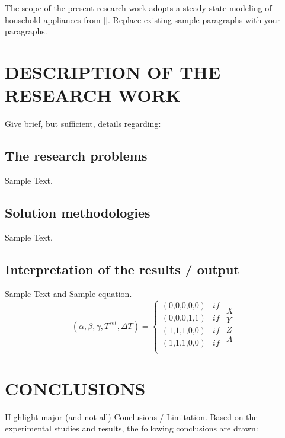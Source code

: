 \documentclass[12pt,a4paper, twoside]{report}
\begin{document}
The scope of the present research work adopts a steady state modeling of household appliances from [\cite{arun2017}]. Replace existing sample paragraphs with your paragraphs.

\section{DESCRIPTION OF THE RESEARCH WORK}
Give brief, but sufficient, details regarding:

\subsection{The research problems}
Sample Text.

\subsection{Solution methodologies}
Sample Text.

\subsection{Interpretation of the results / output}
Sample Text and Sample equation.
\begin{equation}
\left(\alpha,\beta,\gamma, T^{set},\Delta T \right)=\left\{ \begin{matrix}
   \left( \text{0,0,0,0,0} \right) & if  \\
   \left( \text{0,0,0,1,1} \right) & if  \\
   \left( \text{1,1,1,0,0} \right) & if  \\
   \left( \text{1,1,1,0,0} \right) & if  \\
\end{matrix} \right.
\begin{matrix}
   X \\
   Y  \\
   Z  \\
   A   \\
\end{matrix}
\label{Requirements}
\end{equation}

\section{CONCLUSIONS}
Highlight major (and not all) Conclusions / Limitation. Based on the experimental studies and results, the following conclusions are drawn:
\end{document}
